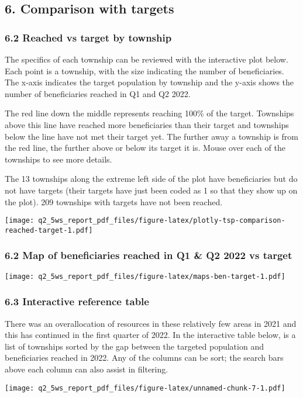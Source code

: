 \documentclass[
]{article}
\begin{document}
\hypertarget{comparison-with-targets}{%
\subsection{6. Comparison with targets}\label{comparison-with-targets}}

\hypertarget{reached-vs-target-by-township}{%
\subsubsection{6.2 Reached vs target by
township}\label{reached-vs-target-by-township}}

The specifics of each township can be reviewed with the interactive plot
below. Each point is a township, with the size indicating the number of
beneficiaries. The x-axis indicates the target population by township
and the y-axis shows the number of beneficiaries reached in Q1 and Q2
2022.

The red line down the middle represents reaching 100\% of the target.
Townships above this line have reached more beneficiaries than their
target and townships below the line have not met their target yet. The
further away a township is from the red line, the further above or below
its target it is. Mouse over each of the townships to see more details.

The 13 townships along the extreme left side of the plot have
beneficiaries but do not have targets (their targets have just been
coded as 1 so that they show up on the plot). 209 townships with targets
have not been reached.

\texttt{[image: q2\_5ws\_report\_pdf\_files/figure-latex/plotly-tsp-comparison-reached-target-1.pdf]}

\hypertarget{map-of-beneficiaries-reached-in-q1-q2-2022-vs-target}{%
\subsubsection{6.2 Map of beneficiaries reached in Q1 \& Q2 2022 vs
target}\label{map-of-beneficiaries-reached-in-q1-q2-2022-vs-target}}

\texttt{[image: q2\_5ws\_report\_pdf\_files/figure-latex/maps-ben-target-1.pdf]}

\hypertarget{interactive-reference-table}{%
\subsubsection{6.3 Interactive reference
table}\label{interactive-reference-table}}

There was an overallocation of resources in these relatively few areas
in 2021 and this has continued in the first quarter of 2022. In the
interactive table below, is a list of townships sorted by the gap
between the targeted population and beneficiaries reached in 2022. Any
of the columns can be sort; the search bars above each column can also
assist in filtering.

\texttt{[image: q2\_5ws\_report\_pdf\_files/figure-latex/unnamed-chunk-7-1.pdf]}
\end{document}
